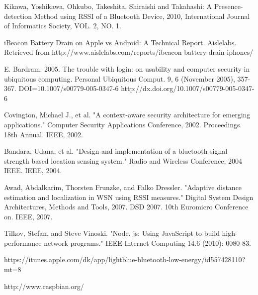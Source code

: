 
%
%
%
\begin{thebibliography}{1}

 Kikawa, Yoshikawa, Ohkubo, Takeshita, Shiraishi and Takahashi:  
 A Presence-detection Method using RSSI of a Bluetooth Device, 2010, International Journal of Informatics Society, VOL. 2, NO. 1. 


iBeacon Battery Drain on Apple vs Android: A Technical Report. Aislelabs. Retrieved from http://www.aislelabs.com/reports/ibeacon-battery-drain-iphones/

E. Bardram. 2005. The trouble with login: on usability and computer security in ubiquitous computing. Personal Ubiquitous Comput. 9, 6 (November 2005), 357-367. DOI=10.1007/s00779-005-0347-6 http://dx.doi.org/10.1007/s00779-005-0347-6

Covington, Michael J., et al. "A context-aware security architecture for emerging applications." Computer Security Applications Conference, 2002. Proceedings. 18th Annual. IEEE, 2002.

Bandara, Udana, et al. "Design and implementation of a bluetooth signal strength based location sensing system." Radio and Wireless Conference, 2004 IEEE. IEEE, 2004.

Awad, Abdalkarim, Thorsten Frunzke, and Falko Dressler. "Adaptive distance estimation and localization in WSN using RSSI measures." Digital System Design Architectures, Methods and Tools, 2007. DSD 2007. 10th Euromicro Conference on. IEEE, 2007.

Tilkov, Stefan, and Steve Vinoski. "Node. js: Using JavaScript to build high-performance network programs." IEEE Internet Computing 14.6 (2010): 0080-83.

https://itunes.apple.com/dk/app/lightblue-bluetooth-low-energy/id557428110?mt=8

http://www.raspbian.org/


\end{thebibliography}
